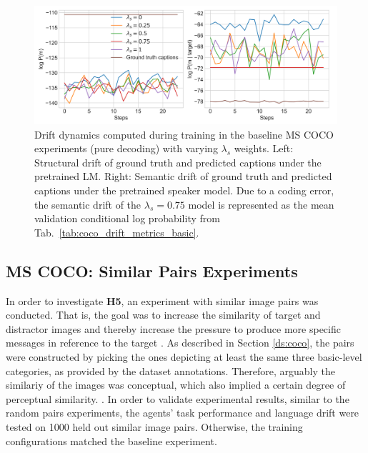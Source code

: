 \begin{figure}
	\centering
	\includegraphics[width=\linewidth]{images/coco_structural_semantic_drift_4000_pure_L_S_all_random.png}
	\caption{Drift dynamics computed during training in the baseline MS COCO experiments (pure decoding) with varying $\lambda_s$ weights. Left: Structural drift of ground truth and predicted captions under the pretrained LM. Right: Semantic drift of ground truth and predicted captions under the pretrained speaker model. Due to a coding error, the semantic drift of the $\lambda_s = 0.75$ model is represented as the mean validation conditional log probability from Tab.~\ref{tab:coco_drift_metrics_basic}.}
	\label{fig:coco_baseline_str_sem_drift_all}
\end{figure}

\subsection{MS COCO: Similar Pairs Experiments}
\label{expt:coco_similar_pairs}
In order to investigate \textbf{H5}, an experiment with similar image pairs was conducted. That is, the goal was to increase the similarity of target and distractor images and thereby increase the pressure to produce more specific messages in reference to the target \parencite[cf.][]{graf2016animal}. As described in Section \ref{ds:coco}, the pairs were constructed by picking the ones depicting at least the same three basic-level categories, as provided by the dataset annotations. Therefore, arguably the similariy of the images was conceptual, which also implied a certain degree of perceptual similarity. . In order to validate experimental results, similar to the random pairs experiments, the agents' task performance and language drift were tested on 1000 held out similar image pairs. 
Otherwise, the training configurations matched the baseline experiment. 

